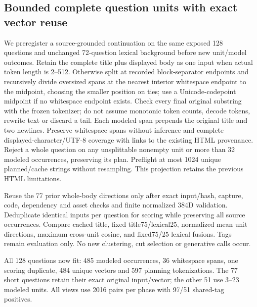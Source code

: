 \documentclass[11pt]{article}
\begin{document}
\subsection{Bounded complete question units with exact vector reuse}
We preregister a source-grounded continuation on the same exposed 128 questions
and unchanged 72-question lexical background before new unit/model outcomes.
Retain the complete title plus displayed body as one input when actual token
length is 2--512. Otherwise split at recorded block-separator endpoints and
recursively divide oversized spans at the nearest interior whitespace endpoint
to the midpoint, choosing the smaller position on ties; use a Unicode-codepoint
midpoint if no whitespace endpoint exists. Check every final original substring
with the frozen tokenizer; do not assume monotonic token counts, decode tokens,
rewrite text or discard a tail. Each modeled span prepends the original title
and two newlines. Preserve whitespace spans without inference and complete
displayed-character/UTF-8 coverage with links to the existing HTML provenance.
Reject a whole question on any unsplittable nonempty unit or more than 32 modeled
occurrences, preserving its plan. Preflight at most 1024 unique planned/cache
strings without resampling. This projection retains the previous HTML limitations.

Reuse the 77 prior whole-body directions only after exact input/hash, capture,
code, dependency and asset checks and finite normalized 384D validation. Deduplicate
identical inputs per question for scoring while preserving all source occurrences.
Compare cached title, fixed title75/lexical25, normalized mean unit directions,
maximum cross-unit cosine, and fixed75/25 lexical fusions. Tags remain evaluation
only. No new clustering, cut selection or generative calls occur.

All 128 questions now fit: 485 modeled occurrences, 36 whitespace spans, one
scoring duplicate, 484 unique vectors and 597 planning tokenizations. The 77 short
questions retain their exact original input/vector; the other 51 use 3--23 modeled
units. All views use 2016 pairs per phase with 97/51 shared-tag positives.
\end{document}
